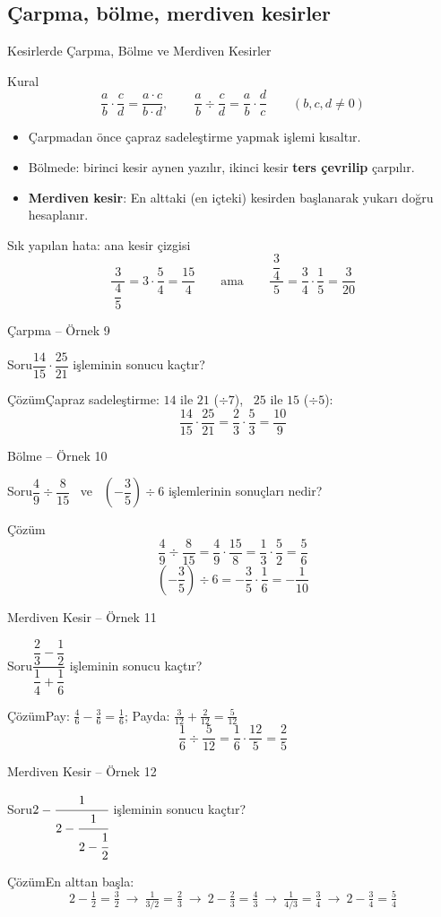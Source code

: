 \documentclass[aspectratio=169,11pt,handout]{beamer}
\newcommand{\soru}[3]{%
\begin{frame}{#1}
  \begin{block}{Soru}\large #2\end{block}
  \pause
  \begin{exampleblock}{Çözüm}\large #3\end{exampleblock}
\end{frame}}
\begin{document}
\subsection{Çarpma, bölme, merdiven kesirler}
\begin{frame}{Kesirlerde Çarpma, Bölme ve Merdiven Kesirler}
\begin{block}{Kural}
\[\frac{a}{b}\cdot\frac{c}{d}=\frac{a\cdot c}{b\cdot d},\qquad \frac{a}{b}\div\frac{c}{d}=\frac{a}{b}\cdot\frac{d}{c}\qquad(b,c,d\neq 0)\]
\vspace{-6pt}
\begin{itemize}
\item Çarpmadan önce çapraz sadeleştirme yapmak işlemi kısaltır.
\item Bölmede: birinci kesir aynen yazılır, ikinci kesir \textbf{ters çevrilip} çarpılır.
\item \textbf{Merdiven kesir}: En alttaki (en içteki) kesirden başlanarak yukarı doğru hesaplanır.
\end{itemize}
\end{block}
\begin{alertblock}{Sık yapılan hata: ana kesir çizgisi}
\[\frac{3}{\ \dfrac{4}{5}\ }=3\cdot\frac{5}{4}=\frac{15}{4}\qquad\text{ama}\qquad \frac{\ \dfrac{3}{4}\ }{5}=\frac{3}{4}\cdot\frac{1}{5}=\frac{3}{20}\]
\end{alertblock}
\end{frame}

\soru{Çarpma -- Örnek 9}
{\(\dfrac{14}{15}\cdot\dfrac{25}{21}\) işleminin sonucu kaçtır?}
{Çapraz sadeleştirme: \(14\) ile \(21\) (\(\div 7\)), \ \(25\) ile \(15\) (\(\div 5\)):
\[\frac{14}{15}\cdot\frac{25}{21}=\frac{2}{3}\cdot\frac{5}{3}=\frac{10}{9}\]}

\soru{Bölme -- Örnek 10}
{\(\dfrac{4}{9}\div\dfrac{8}{15}\) \ ve \ \(\left(-\dfrac{3}{5}\right)\div 6\) işlemlerinin sonuçları nedir?}
{\[\frac{4}{9}\div\frac{8}{15}=\frac{4}{9}\cdot\frac{15}{8}=\frac{1}{3}\cdot\frac{5}{2}=\frac{5}{6}\]
\[\left(-\frac{3}{5}\right)\div 6=-\frac{3}{5}\cdot\frac{1}{6}=-\frac{1}{10}\]}

\soru{Merdiven Kesir -- Örnek 11}
{\(\dfrac{\dfrac{2}{3}-\dfrac{1}{2}}{\dfrac{1}{4}+\dfrac{1}{6}}\) işleminin sonucu kaçtır?}
{Pay: \(\frac{4}{6}-\frac{3}{6}=\frac{1}{6}\); \quad Payda: \(\frac{3}{12}+\frac{2}{12}=\frac{5}{12}\)
\[\frac{1}{6}\div\frac{5}{12}=\frac{1}{6}\cdot\frac{12}{5}=\frac{2}{5}\]}

\soru{Merdiven Kesir -- Örnek 12}
{\(2-\cfrac{1}{2-\cfrac{1}{2-\cfrac{1}{2}}}\) işleminin sonucu kaçtır?}
{En alttan başla:
\[2-\tfrac{1}{2}=\tfrac{3}{2}\ \rightarrow\ \tfrac{1}{3/2}=\tfrac{2}{3}\ \rightarrow\ 2-\tfrac{2}{3}=\tfrac{4}{3}\ \rightarrow\ \tfrac{1}{4/3}=\tfrac{3}{4}\ \rightarrow\ 2-\tfrac{3}{4}=\tfrac{5}{4}\]}
\end{document}
